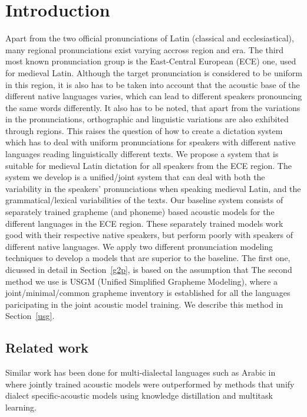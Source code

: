 \documentclass[runningheads,a4paper]{llncs}
\begin{document}
\section{Introduction}
Apart from the two official pronunciations of Latin (classical and ecclesiastical), many regional pronunciations exist varying accross region and era.
The third most known pronunciation group is the East-Central European (ECE) one, used for medieval Latin.
Although the target pronunciation is considered to be uniform in this region, it is also has to be taken into account that the acoustic base of the different native languages varies, which can lead to different speakers pronouncing the same words differently.
It also has to be noted, that apart from the variations in the pronunciations, orthographic and linguistic variations are also exhibited through regions.
This raises the question of how to create a dictation system which has to deal with uniform pronunciations for speakers with different native languages reading linguistically different texts.
We propose a system that is suitable for medieval Latin dictation for all speakers from the ECE region.
The system we develop is a unified/joint system that can deal with both the variability in the speakers' pronunciations when speaking medieval Latin, and the grammatical/lexical variabilities of the texts.
Our baseline system consists of separately trained grapheme (and phoneme) based acoustic models for the different languages in the ECE region.
These separately trained models work good with their respective native speakers, but perform poorly with speakers of different native languages.
We apply two different pronunciation modeling techniques to develop a models that are superior to the baseline.
The first one, dicussed in detail in Section~\ref{g2p}, is based on the assumption that 
The second method we use is USGM (Unified Simplified Grapheme Modeling), where a joint/minimal/common grapheme inventory is established for all the languages paricipating in the joint acoustic model training.
We describe this method in Section~\ref{usg}.

\subsection{Related work}
Similar work has been done for multi-dialectal languages such as Arabic in~\cite{elfeky16} where jointly trained acoustic models were outperformed by methods that unify dialect specific-acoustic models using knowledge distillation and multitask learning.
\end{document}

